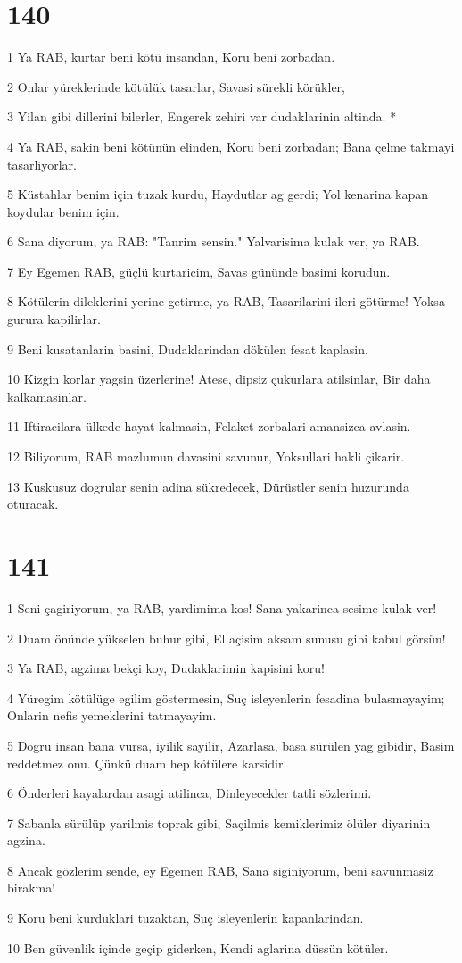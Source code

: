 \chapter{140}

\par 1 Ya RAB, kurtar beni kötü insandan, Koru beni zorbadan.
\par 2 Onlar yüreklerinde kötülük tasarlar, Savasi sürekli körükler,
\par 3 Yilan gibi dillerini bilerler, Engerek zehiri var dudaklarinin altinda. *
\par 4 Ya RAB, sakin beni kötünün elinden, Koru beni zorbadan; Bana çelme takmayi tasarliyorlar.
\par 5 Küstahlar benim için tuzak kurdu, Haydutlar ag gerdi; Yol kenarina kapan koydular benim için.
\par 6 Sana diyorum, ya RAB: "Tanrim sensin." Yalvarisima kulak ver, ya RAB.
\par 7 Ey Egemen RAB, güçlü kurtaricim, Savas gününde basimi korudun.
\par 8 Kötülerin dileklerini yerine getirme, ya RAB, Tasarilarini ileri götürme! Yoksa gurura kapilirlar.
\par 9 Beni kusatanlarin basini, Dudaklarindan dökülen fesat kaplasin.
\par 10 Kizgin korlar yagsin üzerlerine! Atese, dipsiz çukurlara atilsinlar, Bir daha kalkamasinlar.
\par 11 Iftiracilara ülkede hayat kalmasin, Felaket zorbalari amansizca avlasin.
\par 12 Biliyorum, RAB mazlumun davasini savunur, Yoksullari hakli çikarir.
\par 13 Kuskusuz dogrular senin adina sükredecek, Dürüstler senin huzurunda oturacak.

\chapter{141}

\par 1 Seni çagiriyorum, ya RAB, yardimima kos! Sana yakarinca sesime kulak ver!
\par 2 Duam önünde yükselen buhur gibi, El açisim aksam sunusu gibi kabul görsün!
\par 3 Ya RAB, agzima bekçi koy, Dudaklarimin kapisini koru!
\par 4 Yüregim kötülüge egilim göstermesin, Suç isleyenlerin fesadina bulasmayayim; Onlarin nefis yemeklerini tatmayayim.
\par 5 Dogru insan bana vursa, iyilik sayilir, Azarlasa, basa sürülen yag gibidir, Basim reddetmez onu. Çünkü duam hep kötülere karsidir.
\par 6 Önderleri kayalardan asagi atilinca, Dinleyecekler tatli sözlerimi.
\par 7 Sabanla sürülüp yarilmis toprak gibi, Saçilmis kemiklerimiz ölüler diyarinin agzina.
\par 8 Ancak gözlerim sende, ey Egemen RAB, Sana siginiyorum, beni savunmasiz birakma!
\par 9 Koru beni kurduklari tuzaktan, Suç isleyenlerin kapanlarindan.
\par 10 Ben güvenlik içinde geçip giderken, Kendi aglarina düssün kötüler.

